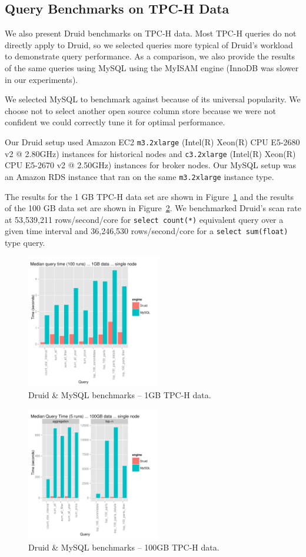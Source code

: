 \documentclass{acm_proc_article-sp}
\begin{document}
\subsection{Query Benchmarks on TPC-H Data}
We also present Druid benchmarks on TPC-H data. 
Most TPC-H queries do not directly apply to Druid, so we
selected queries more typical of Druid's workload to demonstrate query performance. As a
comparison, we also provide the results of the same queries using MySQL using the
MyISAM engine (InnoDB was slower in our experiments).

We selected MySQL to benchmark
against because of its universal popularity. We choose not to select another
open source column store because we were not confident we could correctly tune
it for optimal performance.

Our Druid setup used Amazon EC2
\texttt{m3.2xlarge} (Intel(R) Xeon(R) CPU E5-2680 v2 @ 2.80GHz) instances for
historical nodes and \texttt{c3.2xlarge} (Intel(R) Xeon(R) CPU E5-2670 v2 @ 2.50GHz) instances for broker
nodes. Our MySQL setup was an Amazon RDS instance that ran on the same \texttt{m3.2xlarge} instance type.

The results for the 1 GB TPC-H data set are shown
in Figure~\ref{fig:tpch_1gb} and the results of the 100 GB data set are shown
in Figure~\ref{fig:tpch_100gb}. We benchmarked Druid's scan rate at
53,539,211 rows/second/core for \texttt{select count(*)} equivalent query over a given time interval
and 36,246,530 rows/second/core for a \texttt{select sum(float)} type query.

\begin{figure}
\centering
\includegraphics[width = 2.3in]{tpch_1gb}
\caption{Druid \& MySQL benchmarks -- 1GB TPC-H data.}
\label{fig:tpch_1gb}
\end{figure}

\begin{figure}
\centering
\includegraphics[width = 2.3in]{tpch_100gb}
\caption{Druid \& MySQL benchmarks -- 100GB TPC-H data.}
\label{fig:tpch_100gb}
\end{figure}
\end{document}
